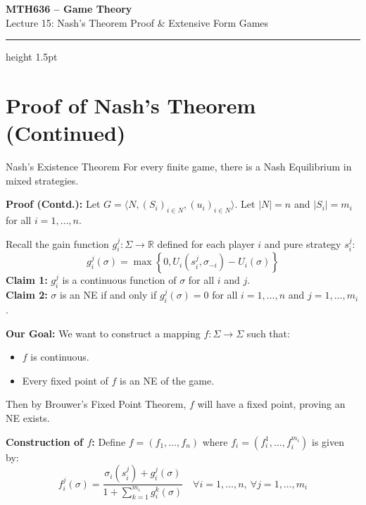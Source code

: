 \documentclass[12pt, a4paper]{article}
\begin{document}
\begin{center}
  {\LARGE\bfseries\sffamily\color{defblue} MTH636 -- Game Theory}\\[6pt]
  {\Large\sffamily Lecture 15: Nash's Theorem Proof \& Extensive Form Games}\\[4pt]
\end{center}
\vspace{0.5cm}
\hrule height 1.5pt
\vspace{0.3cm}

\section{Proof of Nash's Theorem (Continued)}

\begin{thmbox}{Nash's Existence Theorem}
  For every finite game, there is a Nash Equilibrium in mixed strategies.
\end{thmbox}

\textbf{Proof (Contd.):}
Let $G = \langle N, (S_i)_{i \in N}, (u_i)_{i \in N} \rangle$. Let $|N| = n$ and $|S_i| = m_i$ for all $i = 1, \dots, n$.

Recall the gain function $g_i^j : \Sigma \to \mathbb{R}$ defined for each player $i$ and pure strategy $s_i^j$:
\[
  g_i^j(\sigma) = \max \left\{ 0, U_i(s_i^j, \sigma_{-i}) - U_i(\sigma) \right\}
\]
\textbf{Claim 1:} $g_i^j$ is a continuous function of $\sigma$ for all $i$ and $j$. \\
\textbf{Claim 2:} $\sigma$ is an NE if and only if $g_i^j(\sigma) = 0$ for all $i=1,\dots,n$ and $j=1,\dots,m_i$.

\textbf{Our Goal:} We want to construct a mapping $f: \Sigma \to \Sigma$ such that:
\begin{itemize}
    \item $f$ is continuous.
    \item Every fixed point of $f$ is an NE of the game.
\end{itemize}
Then by Brouwer's Fixed Point Theorem, $f$ will have a fixed point, proving an NE exists.

\textbf{Construction of $f$:}
Define $f = (f_1, \dots, f_n)$ where $f_i = (f_i^1, \dots, f_i^{m_i})$ is given by:
\[
  f_i^j(\sigma) = \frac{\sigma_i(s_i^j) + g_i^j(\sigma)}{1 + \sum_{k=1}^{m_i} g_i^k(\sigma)} \quad \forall i=1,\dots,n, \ \forall j=1,\dots,m_i
\]
\end{document}

